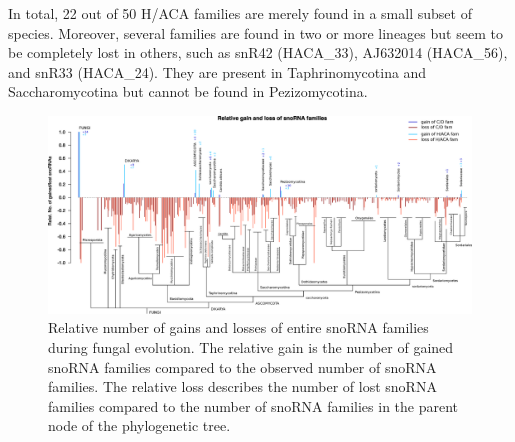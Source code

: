 In total, 22 out of 50 H/ACA families are merely found in a
small subset of species. Moreover, several families are found in two
or more lineages but seem to be completely lost in others, such as snR42 (HACA\_33),
AJ632014 (HACA\_56), and snR33 (HACA\_24). They are present in Taphrinomycotina and
Saccharomycotina but cannot be found in Pezizomycotina. 


\begin{figure}
  \centering
  \includegraphics[width=\textwidth]{pics/fungi_relative_gain_loss.eps}
  \caption{Relative number of gains and losses of entire snoRNA families during fungal
evolution. The relative gain is the number of gained snoRNA families compared to the
observed number of snoRNA families. The relative loss describes the number of lost
snoRNA families compared to the number of snoRNA families in the parent node of the
phylogenetic tree.}
\label{fig:relative_innovation_deletion_event}
\end{figure}


